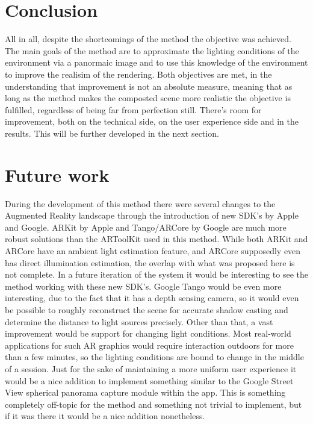 \section{Conclusion}
All in all, despite the shortcomings of the method the objective was achieved. The main goals of the method are to approximate the lighting conditions of the environment via a panormaic image and to use this knowledge of the environment to improve the realisim of the rendering. Both objectives are met, in the understanding that improvement is not an absolute measure, meaning that as long as the method makes the composted scene more realistic the objective is fulfilled, regardless of being far from perfection still.\newline
There's room for improvement, both on the technical side, on the user experience side and in the results. This will be further developed in the next section.

\section{Future work}
During the development of this method there were several changes to the Augmented Reality landscape through the introduction of new SDK's by Apple and Google. ARKit by Apple and Tango/ARCore by Google are much more robust solutions than the ARToolKit used in this method. While both ARKit and ARCore have an ambient light estimation feature, and ARCore supposedly even has direct illumination estimation, the overlap with what was proposed here is not complete. In a future iteration of the system it would be interesting to see the method working with these new SDK's. Google Tango would be even more interesting, due to the fact that it has a depth sensing camera, so it would even be possible to roughly reconstruct the scene for accurate shadow casting and determine the distance to light sources precisely.\newline
Other than that, a vast improvement would be support for changing light conditions. Most real-world applications for such AR graphics would require interaction outdoors for more than a few minutes, so the lighting conditions are bound to change in the middle of a session.\newline
Just for the sake of maintaining a more uniform user experience it would be a nice addition to implement something similar to the Google Street View spherical panorama capture module within the app. This is something completely off-topic for the method and something not trivial to implement, but if it was there it would be a nice addition nonetheless. 